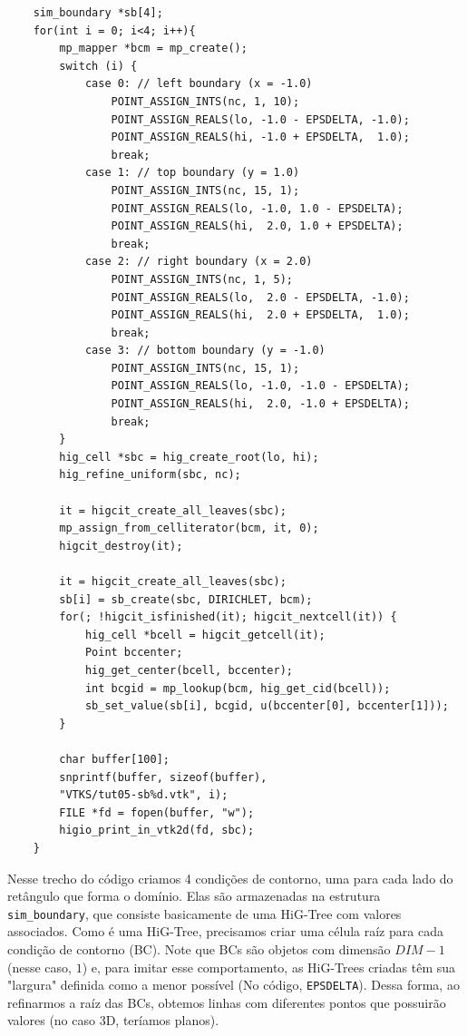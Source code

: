 \begin{verbatim}
	sim_boundary *sb[4];
    for(int i = 0; i<4; i++){ 
        mp_mapper *bcm = mp_create();
        switch (i) {
            case 0: // left boundary (x = -1.0)
                POINT_ASSIGN_INTS(nc, 1, 10);
                POINT_ASSIGN_REALS(lo, -1.0 - EPSDELTA, -1.0);
                POINT_ASSIGN_REALS(hi, -1.0 + EPSDELTA,  1.0);
                break;
            case 1: // top boundary (y = 1.0)
                POINT_ASSIGN_INTS(nc, 15, 1);
                POINT_ASSIGN_REALS(lo, -1.0, 1.0 - EPSDELTA);
                POINT_ASSIGN_REALS(hi,  2.0, 1.0 + EPSDELTA);
                break;
            case 2: // right boundary (x = 2.0)
                POINT_ASSIGN_INTS(nc, 1, 5);
                POINT_ASSIGN_REALS(lo,  2.0 - EPSDELTA, -1.0);
                POINT_ASSIGN_REALS(hi,  2.0 + EPSDELTA,  1.0);
                break;
            case 3: // bottom boundary (y = -1.0)
                POINT_ASSIGN_INTS(nc, 15, 1);
                POINT_ASSIGN_REALS(lo, -1.0, -1.0 - EPSDELTA);
                POINT_ASSIGN_REALS(hi,  2.0, -1.0 + EPSDELTA);
                break;
        }
        hig_cell *sbc = hig_create_root(lo, hi);
        hig_refine_uniform(sbc, nc);
        
        it = higcit_create_all_leaves(sbc);
        mp_assign_from_celliterator(bcm, it, 0);
        higcit_destroy(it);

        it = higcit_create_all_leaves(sbc);
        sb[i] = sb_create(sbc, DIRICHLET, bcm);
        for(; !higcit_isfinished(it); higcit_nextcell(it)) {
            hig_cell *bcell = higcit_getcell(it);
			Point bccenter;
			hig_get_center(bcell, bccenter);
			int bcgid = mp_lookup(bcm, hig_get_cid(bcell));
			sb_set_value(sb[i], bcgid, u(bccenter[0], bccenter[1]));
        }

        char buffer[100];
        snprintf(buffer, sizeof(buffer), 
		"VTKS/tut05-sb%d.vtk", i);
        FILE *fd = fopen(buffer, "w");
        higio_print_in_vtk2d(fd, sbc);
    }
\end{verbatim}

Nesse trecho do código criamos 4 condições de contorno, uma para cada lado do retângulo que forma o domínio. Elas são armazenadas na estrutura \texttt{sim\_boundary}, que consiste basicamente de uma HiG-Tree com valores associados. Como é uma HiG-Tree, precisamos criar uma célula raíz para cada condição de contorno (BC). Note que BCs são objetos com dimensão $DIM-1$ (nesse caso, $1$) e, para imitar esse comportamento, as HiG-Trees criadas têm sua "largura" definida como a menor possível (No código, \texttt{EPSDELTA}). Dessa forma, ao refinarmos a raíz das BCs, obtemos linhas com diferentes pontos que possuirão valores (no caso 3D, teríamos planos).

